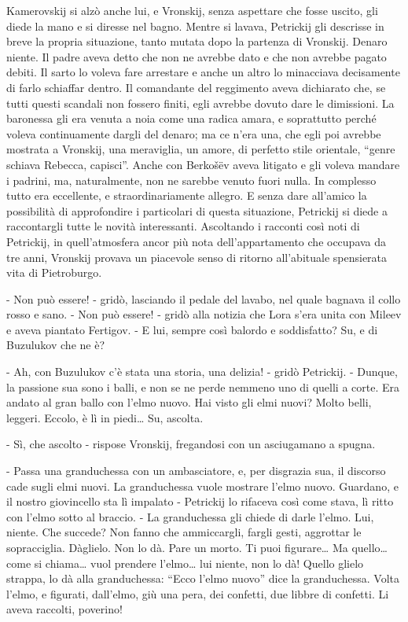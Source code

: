 Kamerovskij si alzò anche lui, e Vronskij, senza aspettare che fosse uscito, gli diede la mano e si diresse nel bagno. Mentre si lavava, Petrickij gli descrisse in breve la propria situazione, tanto mutata dopo la partenza di Vronskij. Denaro niente. Il padre aveva detto che non ne avrebbe dato e che non avrebbe pagato debiti. Il sarto lo voleva fare arrestare e anche un altro lo minacciava decisamente di farlo schiaffar dentro. Il comandante del reggimento aveva dichiarato che, se tutti questi scandali non fossero finiti, egli avrebbe dovuto dare le dimissioni. La baronessa gli era venuta a noia come una radica amara, e soprattutto perché voleva continuamente dargli del denaro; ma ce n'era una, che egli poi avrebbe mostrata a Vronskij, una meraviglia, un amore, di perfetto stile orientale, ``genre schiava Rebecca, capisci''. Anche con Berkošëv aveva litigato e gli voleva mandare i padrini, ma, naturalmente, non ne sarebbe venuto fuori nulla. In complesso tutto era eccellente, e straordinariamente allegro. E senza dare all'amico la possibilità di approfondire i particolari di questa situazione, Petrickij si diede a raccontargli tutte le novità interessanti. Ascoltando i racconti così noti di Petrickij, in quell'atmosfera ancor più nota dell'appartamento che occupava da tre anni, Vronskij provava un piacevole senso di ritorno all'abituale spensierata vita di Pietroburgo. 

- Non può essere! - gridò, lasciando il pedale del lavabo, nel quale bagnava il collo rosso e sano. - Non può essere! - gridò alla notizia che Lora s'era unita con Mileev e aveva piantato Fertigov. - E lui, sempre così balordo e soddisfatto? Su, e di Buzulukov che ne è? 

- Ah, con Buzulukov c'è stata una storia, una delizia! - gridò Petrickij. - Dunque, la passione sua sono i balli, e non se ne perde nemmeno uno di quelli a corte. Era andato al gran ballo con l'elmo nuovo. Hai visto gli elmi nuovi? Molto belli, leggeri. Eccolo, è lì in piedi\ldots{} Su, ascolta. 

- Sì, che ascolto - rispose Vronskij, fregandosi con un asciugamano a spugna. 

- Passa una granduchessa con un ambasciatore, e, per disgrazia sua, il discorso cade sugli elmi nuovi. La granduchessa vuole mostrare l'elmo nuovo. Guardano, e il nostro giovincello sta lì impalato - Petrickij lo rifaceva così come stava, lì ritto con l'elmo sotto al braccio. - La granduchessa gli chiede di darle l'elmo. Lui, niente. Che succede? Non fanno che ammiccargli, fargli gesti, aggrottar le sopracciglia. Dàglielo. Non lo dà. Pare un morto. Ti puoi figurare\ldots{} Ma quello\ldots{} come si chiama\ldots{} vuol prendere l'elmo\ldots{} lui niente, non lo dà! Quello glielo strappa, lo dà alla granduchessa: ``Ecco l'elmo nuovo'' dice la granduchessa. Volta l'elmo, e figurati, dall'elmo, giù una pera, dei confetti, due libbre di confetti. Li aveva raccolti, poverino! 

